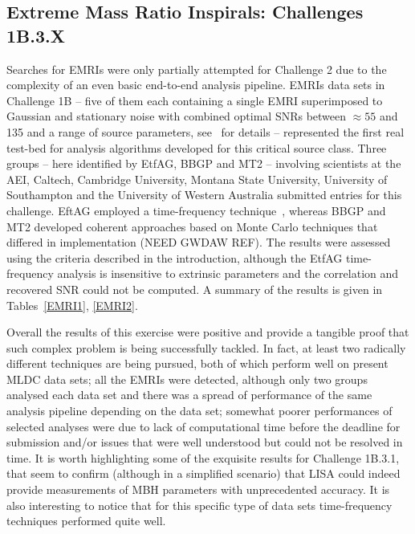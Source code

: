 \documentclass{iopart}
\begin{document}
\subsection{Extreme Mass Ratio Inspirals: Challenges 1B.3.X}

Searches for EMRIs were only partially attempted for Challenge 2 due to the complexity of an even basic end-to-end analysis pipeline. EMRIs data sets in Challenge 1B -- five of them each containing a single EMRI superimposed to Gaussian and stationary noise with combined optimal SNRs between $\approx 55$ and 135 and a range of source parameters, see~\cite{mldcgwdaw2} for details -- represented the first real test-bed for analysis algorithms developed for this critical source class. Three groups -- here identified by EtfAG, BBGP and MT2 -- involving scientists at the AEI, Caltech, Cambridge University, Montana State University,  University of Southampton and the University of Western Australia submitted entries for this challenge. EftAG employed a time-frequency technique~\cite{gmw}, whereas BBGP and MT2 developed coherent approaches based on Monte Carlo techniques that differed in implementation (NEED GWDAW REF). The results were assessed using the criteria described in the introduction, although the EtfAG time-frequency analysis is insensitive to extrinsic parameters and the correlation and recovered SNR could not be computed. A summary of the results is given in Tables~\ref{EMRI1}, \ref{EMRI2}. 

Overall the results of this exercise were positive and provide a tangible proof that such complex problem is being successfully tackled. In fact, at least two radically different techniques are being pursued, both of which perform well on present MLDC data sets; all the EMRIs were detected, although only two groups analysed each data set and there was a spread of performance of the same analysis pipeline depending on the data set; somewhat poorer performances of selected analyses were due to lack of computational time before the deadline for submission and/or issues that were well understood but could not be resolved in time. It is worth highlighting some of the exquisite results for Challenge 1B.3.1, that seem to confirm (although in a simplified scenario) that LISA could indeed provide measurements of MBH parameters with unprecedented accuracy.  It is also interesting to notice that for this specific type of data sets time-frequency techniques performed quite well.
\end{document}
